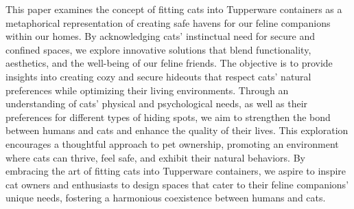 This paper examines the concept of fitting cats into Tupperware containers as a metaphorical representation of creating safe havens for our feline companions within our homes. By acknowledging cats' instinctual need for secure and confined spaces, we explore innovative solutions that blend functionality, aesthetics, and the well-being of our feline friends. The objective is to provide insights into creating cozy and secure hideouts that respect cats' natural preferences while optimizing their living environments. Through an understanding of cats' physical and psychological needs, as well as their preferences for different types of hiding spots, we aim to strengthen the bond between humans and cats and enhance the quality of their lives. This exploration encourages a thoughtful approach to pet ownership, promoting an environment where cats can thrive, feel safe, and exhibit their natural behaviors. By embracing the art of fitting cats into Tupperware containers, we aspire to inspire cat owners and enthusiasts to design spaces that cater to their feline companions' unique needs, fostering a harmonious coexistence between humans and cats.

